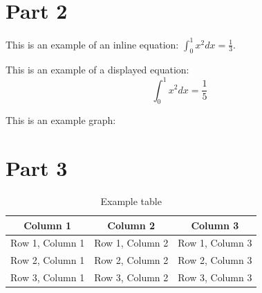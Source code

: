 \documentclass[12pt,a4paper]{report}
\begin{document}
\section{Part 2}
This is an example of an inline equation: $\int_{0}^{1} x^2 dx = \frac{1}{3}$.

This is an example of a displayed equation:
\begin{equation}
    \int_{0}^{1} x^2 dx = \frac{1}{5}
\end{equation}

This is an example graph:
\begin{center}
\end{center}

\section{Part 3}
\begin{table}[h]
    \centering
    \begin{tabular}{|c|c|c|}
        \hline
        \textbf{Column 1} & \textbf{Column 2} & \textbf{Column 3} \\
        \hline
        Row 1, Column 1   & Row 1, Column 2   & Row 1, Column 3   \\
        \hline
        Row 2, Column 1   & Row 2, Column 2   & Row 2, Column 3   \\
        \hline
        Row 3, Column 1   & Row 3, Column 2   & Row 3, Column 3   \\
        \hline
    \end{tabular}
    \caption{Example table}
\end{table}
\end{document}
